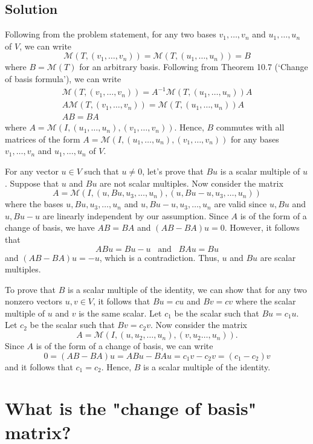 \documentclass{article}
\begin{document}
\subsection*{Solution}
Following from the problem statement, for any two bases $v_1,\ldots,v_n$ and $u_1,\ldots,u_n$ of $V$, we can write 
\[\mathcal{M}(T,(v_1,\ldots,v_n))=\mathcal{M}(T,(u_1,\ldots,u_n))=B\]
where $B=\mathcal{M}(T)$ for an arbitrary basis. 
Following from Theorem 10.7 (`Change of basis formula'), we can write
\begin{gather*}
    \mathcal{M}(T,(v_1,\ldots,v_n))=A^{-1}\mathcal{M}(T,(u_1,\ldots,u_n))A\\
    A\mathcal{M}(T,(v_1,\ldots,v_n))=\mathcal{M}(T,(u_1,\ldots,u_n))A\\
    AB=BA
\end{gather*}
where $A=\mathcal{M}(I,(u_1,\ldots,u_n),(v_1,\ldots,v_n))$. Hence, $B$ commutes with all matrices of the form $A=\mathcal{M}(I,(u_1,\ldots,u_n),(v_1,\ldots,v_n))$ for any bases $v_1,\ldots,v_n$ and $u_1,\ldots,u_n$ of $V$. 

For any vector $u\in V$ such that $u\neq 0$, let's prove that $Bu$ is a scalar multiple of $u$. Suppose that $u$ and $Bu$ are not scalar multiples. Now consider the matrix
\[A=\mathcal{M}(I,(u,Bu,u_3,\ldots,u_n),(u,Bu-u,u_3,\dots,u_n))\]
where the bases $u,Bu,u_3,\ldots,u_n$ and $u,Bu-u,u_3,\dots,u_n$ are valid since $u,Bu$ and $u,Bu-u$ are linearly independent by our assumption. Since $A$ is of the form of a change of basis, we have $AB=BA$ and $(AB-BA)u=0$. However, it follows that
\[ABu=Bu-u\;\;\;\text{and}\;\;\; BAu=Bu\]
and $(AB-BA)u=-u$, which is a contradiction. Thus, $u$ and $Bu$ are scalar multiples.

To prove that $B$ is a scalar multiple of the identity, we can show that for any two nonzero vectors $u,v\in V$, it follows that $Bu=cu$ and $Bv=cv$ where the scalar multiple of $u$ and $v$ is the same scalar. Let $c_1$ be the scalar such that $Bu=c_1u$. Let $c_2$ be the scalar such that $Bv=c_2v$. Now consider the matrix
\[A=\mathcal{M}(I,(u,u_2,\ldots,u_n),(v,u_2\dots,u_n)).\]
Since $A$ is of the form of a change of basis, we can write
\[0=(AB-BA)u=ABu-BAu=c_1v-c_2v=(c_1-c_2)v\]
and it follows that $c_1=c_2$. Hence, $B$ is a scalar multiple of the identity.

\clearpage

\section{What is the "change of basis" matrix?}
\end{document}
